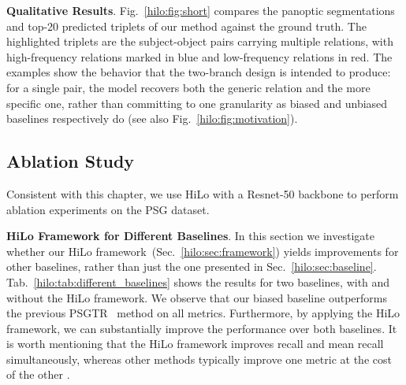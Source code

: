 \noindent \textbf{Qualitative Results}.
Fig.~\ref{hilo:fig:short} compares the panoptic segmentations and top-20 predicted triplets of our method against the ground truth. The highlighted triplets are the subject-object pairs carrying multiple relations, with high-frequency relations marked in blue and low-frequency relations in red. The examples show the behavior that the two-branch design is intended to produce: for a single pair, the model recovers both the generic relation and the more specific one, rather than committing to one granularity as biased and unbiased baselines respectively do (see also Fig.~\ref{hilo:fig:motivation}).

\subsection{Ablation Study}
Consistent with this chapter, we use HiLo with a Resnet-50 backbone to perform ablation experiments on the PSG dataset.

\begin{table}
\centering
\setlength{\tabcolsep}{8pt}
\caption{Comparison of different baselines, with and without HiLo framework. Using the HiLo framework, we see significant improvements on both metrics.
}
\label{hilo:tab:different_baselines}
\end{table}

\noindent \textbf{HiLo Framework for Different Baselines}.
In this section we investigate whether our HiLo framework~(Sec.~\ref{hilo:sec:framework}) yields improvements for other baselines, rather than just the one presented in Sec.~\ref{hilo:sec:baseline}.
Tab.~\ref{hilo:tab:different_baselines} shows the results for two baselines, with and without the HiLo framework.
We observe that our biased baseline outperforms the previous PSGTR~\citep{yang2022panoptic} method on all metrics.
Furthermore, by applying the HiLo framework, we can substantially improve the performance over both baselines.
It is worth mentioning that the HiLo framework improves recall and mean recall simultaneously, whereas other methods typically improve one metric at the cost of the other \citep{tang2020unbiased, yu2020cogtree}.


